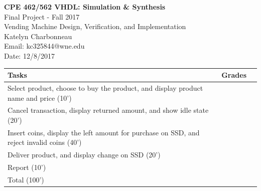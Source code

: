 \documentclass[12pt]{article}
\begin{document}
\begin{figure}[htb]
\hfil \hspace{.5in}
\end{figure}



\begin{center}
{\Large {\bf CPE 462/562 VHDL: Simulation \& Synthesis}}\\
\vspace{0.2in}
Final Project - Fall 2017 \\ 
\vspace{0.2in}
{\Large{Vending Machine Design, Verification, and Implementation}} \\
\vspace{0.2in}
Katelyn Charbonneau \\
Email: kc325844@wne.edu\\
Date: 12/8/2017
\end{center}


  
\begin{table}[!h]
\centering
\begin{tabular}{|M{10cm}|C{3cm}|N}
  \hline
  \textbf{Tasks} & \textbf{Grades} \\ [20pt]
  \hline
Select product, choose to buy the product, and display product name and price (10') & \\ [30pt]

  \hline

  Cancel transaction, display returned amount, and show idle state (20') & \\ [30pt]

  \hline
  
  Insert coins, display the left amount for purchase on SSD, and reject invalid coins (40') & \\ [30pt]

  \hline

  Deliver product, and display change on SSD (20') & \\ [30pt]
  
  \hline
 
 Report (10') & \\ [30pt]
 
  \hline
    \hline

 Total (100') & \\ [30pt]
  
  \hline
\end{tabular}
\end{table}
\end{document}
